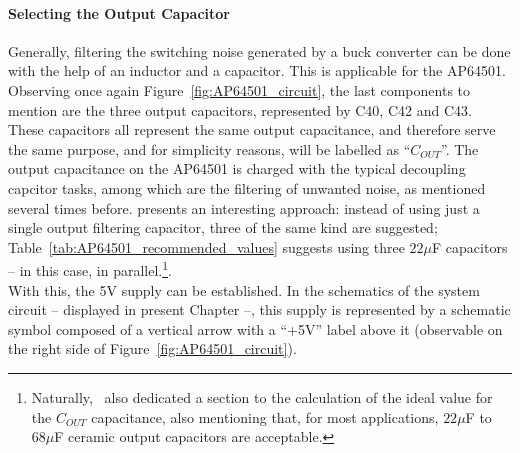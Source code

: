 \paragraph{Selecting the Output Capacitor}	Generally, filtering the switching noise generated by a buck converter can be done with the help of an inductor and a capacitor. This is applicable for the AP64501.
Observing once again Figure~\ref{fig:AP64501_circuit}, the last components to mention are the three output capacitors, represented by C40, C42 and C43. These capacitors all represent the same output capacitance, and therefore serve the same purpose, and for simplicity reasons, will be labelled as ``$C_{OUT}$''. The output capacitance on the AP64501 is charged with the typical decoupling capcitor tasks, among which are the filtering of unwanted noise, as mentioned several times before.
\cite{AP64501} presents an interesting approach: instead of using just a single output filtering capacitor, three of the same kind are suggested; Table~\ref{tab:AP64501_recommended_values} suggests using three $22 \mu$F capacitors -- in this case, in parallel.\footnote[13]{Naturally,~\cite{AP64501} also dedicated a section to the calculation of the ideal value for the $C_{OUT}$ capacitance, also mentioning that, for most applications, $22 \mu$F to $68 \mu$F ceramic output capacitors are acceptable.}.\\

With this, the 5V supply can be established. In the schematics of the system circuit -- displayed in present Chapter --, this supply is represented by a schematic symbol composed of a vertical arrow with a ``+5V'' label above it (observable on the right side of Figure~\ref{fig:AP64501_circuit}).





